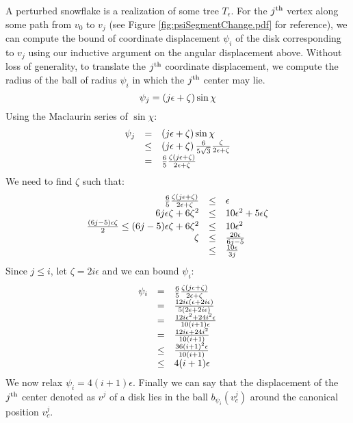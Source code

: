 A perturbed snowflake is a realization of some tree $T_\epsilon$.  
For the $j^\text{th}$ vertex along some path from $v_0$ to $v_j$ (see Figure \ref{fig:psiSegmentChange.pdf} for reference), we can compute the bound of coordinate displacement $\psi_i$ of the disk corresponding to $v_j$ using our inductive argument on the angular displacement above.  
Without loss of generality, to translate the $j^\text{th}$ coordinate displacement, we compute the radius of the ball of radius $\psi_i$ in which the $j^\text{th}$ center may lie. 
$$\psi_j = \left( j \epsilon + \zeta \right) \sin \chi$$
Using the Maclaurin series of $\sin \chi$:
$$
\begin{array}{rcl}
\psi_j &=& \left( j \epsilon + \zeta \right) \sin \chi\\
&\leq& \left( j \epsilon + \zeta \right) \frac{6}{5 \sqrt{3}}\frac{\zeta}{ 2\epsilon + \zeta} \\
&=& \frac{6}{5}\frac{\zeta\left( j \epsilon + \zeta \right)}{2 \epsilon + \zeta}\\
\end{array}
$$
We need to find $\zeta$ such that:
$$ 
\begin{array}{rcl}
\frac{6}{5}\frac{\zeta\left( j \epsilon + \zeta \right)}{2 \epsilon + \zeta} &\leq& \epsilon\\
6j\epsilon \zeta + 6 \zeta^2  &\leq& 10 \epsilon^2 + 5 \epsilon \zeta\\
\frac{(6j-5) \epsilon \zeta}{2}\leq (6j-5)\epsilon \zeta + 6 \zeta^2  &\leq& 10 \epsilon^2 \\
\zeta&\leq& \frac{20\epsilon}{6j-5}\\
&\leq& \frac{10 \epsilon}{3j}
\end{array}
$$
Since $j\leq i$, let $\zeta= 2i\epsilon$ and we can bound $\psi_i$:
$$
\begin{array}{rcl}
\psi_i &=& \frac{6}{5}\frac{\zeta\left( j \epsilon + \zeta \right)}{2 \epsilon + \zeta}\\
&=& \frac{12 i\epsilon \left(  \epsilon + 2i\epsilon \right)}{5\left( 2 \epsilon + 2i\epsilon \right)}\\
&=&\frac{12 i \epsilon^2 + 24 i^2 \epsilon }{10 (i+1) \epsilon}\\
&=&\frac{12i\epsilon + 24i^2}{10(i+1)}\\
&\leq& \frac{36(i+1)^2 \epsilon}{10(i+1)}\\
&\leq& 4(i+1)\epsilon
\end{array}
$$
We now relax $\psi_i = 4(i+1)\epsilon$. Finally we can say that the displacement of the $j^\text{th}$ center denoted as $v^j$ of a disk lies in the ball $b_{\psi_i}(v^j_c)$ around the canonical position $v_c^j$.

